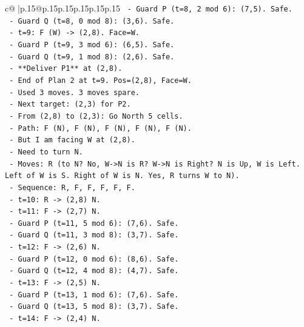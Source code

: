 \documentclass{article}
\begin{document}
{\begin{supertabular}{c@{$\;$}|p{.15\linewidth}@{}p{.15\linewidth}p{.15\linewidth}p{.15\linewidth}p{.15\linewidth}p{.15\linewidth}}
{{{\texttt{          {-} Guard P (t=8, 2 mod 6): (7,5). Safe.} \\
\texttt{          {-} Guard Q (t=8, 0 mod 8): (3,6). Safe.} \\
\texttt{        {-} t=9: F (W) {-}> (2,8). Face=W.} \\
\texttt{          {-} Guard P (t=9, 3 mod 6): (6,5). Safe.} \\
\texttt{          {-} Guard Q (t=9, 1 mod 8): (2,6). Safe.} \\
\texttt{          {-} **Deliver P1** at (2,8).} \\
\texttt{        {-} End of Plan 2 at t=9. Pos=(2,8), Face=W.} \\
\texttt{        {-} Used 3 moves. 3 moves spare.} \\
\texttt{        {-} Next target: (2,3) for P2.} \\
\texttt{        {-} From (2,8) to (2,3): Go North 5 cells.} \\
\texttt{        {-} Path: F (N), F (N), F (N), F (N), F (N).} \\
\texttt{        {-} But I am facing W at (2,8).} \\
\texttt{        {-} Need to turn N.} \\
\texttt{        {-} Moves: R (to N? No, W{-}>N is R? W{-}>N is Right? N is Up, W is Left. Left of W is S. Right of W is N. Yes, R turns W to N).} \\
\texttt{        {-} Sequence: R, F, F, F, F, F.} \\
\texttt{        {-} t=10: R {-}> (2,8) N.} \\
\texttt{        {-} t=11: F {-}> (2,7) N.} \\
\texttt{          {-} Guard P (t=11, 5 mod 6): (7,6). Safe.} \\
\texttt{          {-} Guard Q (t=11, 3 mod 8): (3,7). Safe.} \\
\texttt{        {-} t=12: F {-}> (2,6) N.} \\
\texttt{          {-} Guard P (t=12, 0 mod 6): (8,6). Safe.} \\
\texttt{          {-} Guard Q (t=12, 4 mod 8): (4,7). Safe.} \\
\texttt{        {-} t=13: F {-}> (2,5) N.} \\
\texttt{          {-} Guard P (t=13, 1 mod 6): (7,6). Safe.} \\
\texttt{          {-} Guard Q (t=13, 5 mod 8): (3,7). Safe.} \\
\texttt{        {-} t=14: F {-}> (2,4) N.} \\
}}}
\end{supertabular}}
\end{document}
